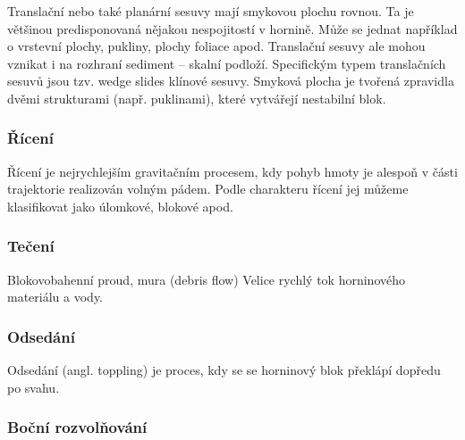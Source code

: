 Translační nebo také planární sesuvy mají smykovou plochu rovnou. Ta je většinou predisponovaná nějakou nespojitostí v hornině. Může se jednat například o vrstevní plochy, pukliny, plochy foliace apod. Translační sesuvy ale mohou vznikat i na rozhraní sediment -- skalní podloží. Specifickým typem translačních sesuvů jsou tzv. wedge slides klínové sesuvy. Smyková plocha je tvořená zpravidla dvěmi strukturami (např. puklinami), které vytvářejí nestabilní blok.

\subsubsection{Řícení}

Řícení je nejrychlejším gravitačním procesem, kdy pohyb hmoty je alespoň v části trajektorie realizován volným pádem. Podle charakteru řícení jej můžeme klasifikovat jako úlomkové, blokové apod.

\subsubsection{Tečení}
Blokovobahenní proud, mura (debris flow)
Velice rychlý tok horninového materiálu a vody. 

\subsubsection{Odsedání}

Odsedání (angl. toppling) je proces, kdy se se horninový blok překlápí dopředu po svahu.



\subsubsection{Boční rozvolňování}

